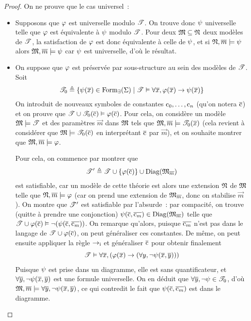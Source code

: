 \begin{proof}
  On ne prouve que le cas universel~:
  \begin{itemize}
  \item[\fbox{$\Rightarrow$}] Supposons que $\varphi$ est universelle modulo
    $\mathscr T$. On trouve donc $\psi$ universelle telle que $\varphi$ est
    équivalente à $\psi$ modulo $\mathscr T$. Pour deux $\mathfrak{M}\subseteq\mathfrak{N}$
    deux modèles de $\mathscr T$, la satisfaction de $\varphi$ est donc équivalente à
    celle de $\psi$, et si $\mathfrak{N},\overline{m}\models\psi$ alors
    $\mathfrak{M},\overline{m}\models\psi$ car $\psi$ est universelle, d'où le
    résultat.
  \item[\fbox{$\Leftarrow$}] On suppose que $\varphi$ est préservée par
    sous-structure au sein des modèles de $\mathscr T$. Soit
    \[\mathscr T_0 \triangleq
    \left\{ \psi(\overline{x})\in\operatorname{Form}_{\exists}(\Sigma) \;\middle\vert\; \mathscr T\vDash\forall \overline{x},\varphi(\overline{x})\to\psi(\overline{x}) \right\}\]
    On introduit de nouveaux symboles de constantes $\mathrm{c}_0,\ldots,\mathrm{c}_n$
    (qu'on notera $\overline{\mathrm{c}}$)
    et on prouve que $\mathscr T\cup\mathscr T_0(\overline{\mathrm{c}})\vDash\varphi(\overline{\mathrm{c}})$. Pour
    cela, on considère un modèle $\mathfrak{M}\models\mathscr T$ et des paramètres
    $\vec m$ dans $\mathfrak{M}$ tels que $\mathfrak{M},\overline{m}\models\mathscr T_0(\overline{x})$
    (cela revient à considérer que $\mathfrak{M}\models\mathscr T_0(\overline{\mathrm{c}})$ en
    interprétant $\overline{\mathrm{c}}$ par $\vec m$), et on souhaite montrer que
    $\mathfrak{M},\overline{m}\models\varphi$.

    Pour cela, on commence par montrer que
    \[\mathscr T' \triangleq \mathscr T\cup\{\varphi(\overline{\mathrm{c}})\}\cup\operatorname{Diag}(\mathfrak{M}_{\overline{m}})\]
    est satisfiable, car un modèle de cette théorie est alors une extension
    $\mathfrak{N}$ de $\mathfrak{M}$ telle que $\mathfrak{N},\overline{m}\models\varphi$ (car on prend
    une extension de $\mathfrak{M}_{\overline{m}}$, donc on stabilise $\vec m$). On montre
    que $\mathscr T'$ est satisfiable par l'absurde~: par compacité, on trouve
    (quitte à prendre une conjonction)
    $\psi(\overline{\mathrm{c}},\overline{\mathrm{c}_m})\in\operatorname{Diag}(\mathfrak{M}_{\overline{m}})$ telle que
    $\mathscr T\cup\varphi(\overline{\mathrm{c}})\vDash
    \lnot(\psi(\overline{\mathrm{c}},\overline{\mathrm{c}_m}))$.
    On remarque qu'alors, puisque $\overline{\mathrm{c}_m}$ n'est pas dans le langage de
    $\mathscr T\cup\varphi(\overline{\mathrm{c}})$, on peut généraliser ces constantes. De
    même, on peut ensuite appliquer la règle $\mathord{\to}_{\mathrm{i}}$ et généraliser $\overline{\mathrm{c}}$
    pour obtenir finalement
    \[\mathscr T\vDash\forall \overline{x},
    (\varphi(\overline{x})\to(\forall y,\lnot\psi(\overline{x},\overline{y})))\]
    Puisque $\psi$ est prise dans un diagramme, elle est sans quantificateur,
    et $\forall \overline{y},\lnot\psi(\overline{x},\overline{y})$ est une formule
    universelle. On en déduit que $\forall\overline{y},\lnot\psi\in\mathscr T_0$,
    d'où $\mathfrak{M},\overline{m}\models \forall \overline{y},\lnot\psi(\overline{x},\overline{y})$, ce
    qui contredit le fait que $\psi(\overline{\mathrm{c}},\overline{\mathrm{c}_m})$ est dans le
    diagramme.


\end{itemize}
\end{proof}
